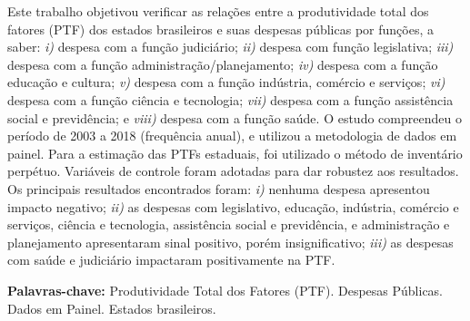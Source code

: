 \documentclass[
  12pt,
  a4paper,
  oneside,
  brazil,
  chapter=TITLE,
  section=TITLE
]{abntex2}
\begin{document}
\begin{resumo}
Este trabalho objetivou verificar as relações entre a produtividade total dos fatores (PTF) dos estados brasileiros e suas despesas públicas por funções, a saber: \textit{i)} despesa com a função judiciário; \textit{ii)} despesa com função legislativa; \textit{iii)} despesa com a função administração/planejamento; \textit{iv)} despesa com a função educação e cultura; \textit{v)} despesa com a função indústria, comércio e serviços; \textit{vi)} despesa com a função ciência e tecnologia; \textit{vii)} despesa com a função assistência social e previdência; e \textit{viii)} despesa com a função saúde. O estudo compreendeu o período de 2003 a 2018 (frequência anual), e utilizou a metodologia de dados em painel. Para a estimação das PTFs estaduais, foi utilizado o método de inventário perpétuo. Variáveis de controle foram adotadas para dar robustez aos resultados. Os principais resultados encontrados foram: \textit{i)} nenhuma despesa apresentou impacto negativo; \textit{ii)} as despesas com legislativo, educação, indústria, comércio e serviços, ciência e tecnologia, assistência social e previdência, e administração e planejamento apresentaram sinal positivo, porém insignificativo; \textit{iii)} as despesas com saúde e judiciário impactaram positivamente na PTF.

\vspace{\onelineskip}
\noindent\textbf{Palavras-chave:} Produtividade Total dos Fatores (PTF). Despesas Públicas. Dados em Painel. Estados brasileiros.
\end{resumo}
\end{document}
